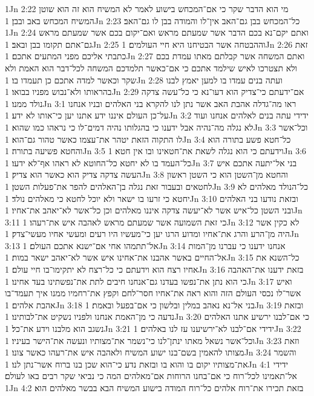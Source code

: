 1Jn 2:22  מי הוא הדבר שקר כי אם־המכחש בישוע לאמר לא המשיח הוא זה הוא שוטן המשיח המכחש באב ובבן׃
1Jn 2:23  כל־המכחש בבן גם־האב אין־לו והמודה בבן לו גם־האב׃
1Jn 2:24  ואתם יקם־נא בכם הדבר אשר שמעתם מראש ואם־יקום בכם אשר שמעתם מראש גם־אתם תקומו בבן ובאב׃
1Jn 2:25  וההבטחה אשר הבטיחנו היא חיי העולמים׃
1Jn 2:26  זאת כתבתי אליכם מפני המתעים אתכם׃
1Jn 2:27  ואתם המשחה אשר קבלתם מאתו עמדת בכם ולא תצטרכו לאיש שילמד אתכם כי אם־כאשר תלמדכם המשחה לכל־דבר הוא האמת ולא שקר וכאשר למדה אתכם כן תעמדו בו׃
1Jn 2:28  ועתה בנים עמדו בו למען יאמץ לבנו בהראותו ולא־נבוש מפניו בבואו׃
1Jn 2:29  אם־ידעתם כי־צדיק הוא דעו־נא כי כל־עשה צדקה נולד ממנו׃
1Jn 3:1  ראו מה־גדלה אהבת האב אשר נתן לנו להקרא בני האלהים ובניו אנחנו על־כן העולם איננו ידע אתנו יען כי־אותו לא ידע׃
1Jn 3:2  ידידי עתה בנים לאלהים אנחנו ועוד לא נגלה מה־נהיה אבל ידענו כי בהגלותו נהיה דמים־לו כי נראהו כמו שהוא׃
1Jn 3:3  וכל־אשר לו התקוה הזאת יטהר את־עצמו כאשר טהור גם־הוא׃
1Jn 3:4  כל־חטא פשע בתורה הוא והחטא פשיעה בתורה׃
1Jn 3:5  וידעתם כי הוא נגלה לשאת את־חטאינו ובו אין חטא׃
1Jn 3:6  כל־העמד בו לא יחטא כל־החוטא לא ראהו אף־לא ידעו׃
1Jn 3:7  בני אל־יתעה אתכם איש העשה צדקה צדיק הוא כאשר הוא צדיק׃
1Jn 3:8  והחטא מן־השטן הוא כי השטן ראשון לחטאים ובעבור זאת נגלה בן־האלהים להפר את־פעלות השטן׃
1Jn 3:9  כל־הנולד מאלהים לא יחטא כי זרעו בו ישאר ולא יוכל לחטא כי מאלהים נולד׃
1Jn 3:10  ובזאת נודעו בני האלהים ובני השטן כל־איש אשר לא־יעשה צדקה איננו מאלהים וכן כל־אשר לא־יאהב את־אחיו׃
1Jn 3:11  כי זאת השמועה אשר שמעתם מראש לאהבה איש את־רעהו׃
1Jn 3:12  לא כקין אשר היה מן־הרע והרג את־אחיו ומדוע הרגו יען כי־מעשיו היו רעים ומעשי אחיו מעשי־צדק׃
1Jn 3:13  אל־תתמהו אחי אם־ישנא אתכם העולם׃
1Jn 3:14  אנחנו ידענו כי עברנו מן־המות אל־החיים באשר אהבנו את־אחינו איש אשר לא־יאהב ישאר במות׃
1Jn 3:15  כל־השנא את אחיו רצח הוא וידעתם כי כל־רצח לא יתקימו־בו חיי עולם׃
1Jn 3:16  בזאת ידענו את־האהבה כי הוא נתן את־נפשו בעדנו גם־אנחנו חיבים לתת את־נפשתינו בעד אחינו׃
1Jn 3:17  ואיש אשר־לו נכסי העולם הזה והוא ראה את־אחיו חסר־לחם וקפץ את־רחמיו ממנו איך תעמד־בו אהבת אלהים׃
1Jn 3:18  בני אל־נא נאהב במלין ובלשון כי אם־בפעל ובאמת׃
1Jn 3:19  ובזאת נדעה כי מן־האמת אנחנו ולפניו נשקיט את־לבותינו׃
1Jn 3:20  כי אם־לבנו ירשיע אתנו האלהים נשגב הוא מלבנו וידע את־כל׃
1Jn 3:21  ידידי אם־לבנו לא־ירשיענו עז לנו באלהים׃
1Jn 3:22  וכל־אשר נשאל מאתו ינתן־לנו כי־נשמר את־מצותיו ונעשה את־הישר בעיניו׃
1Jn 3:23  וזאת מצותו להאמין בשם־בנו ישוע המשיח ולאהבה איש את־רעהו כאשר צונו׃
1Jn 3:24  והשמר את־מצותיו יקום בו והוא בו ובזאת נדע כי־הוא שכן בנו ברוח אשר־נתן לנו׃
1Jn 4:1  ידידי אל־תאמינו לכל־רוח כי אם־בחנו הרוחות אם־מאלהים המה כי נביאי שקר רבים באו לעולם׃
1Jn 4:2  בזאת תכירו את־רוח אלהים כל־רוח המודה בישוע המשיח הבא בבשר מאלהים הוא׃
